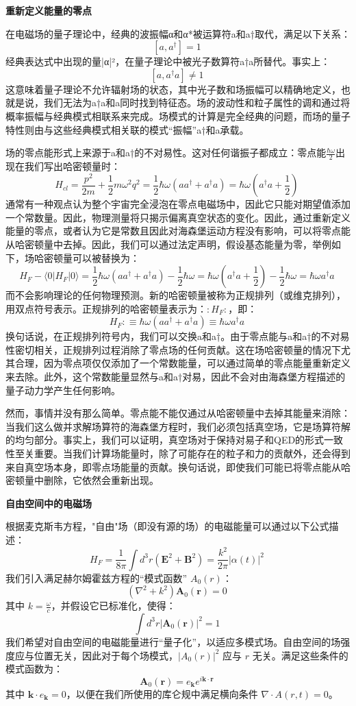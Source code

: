 \textbf{重新定义能量的零点}

在电磁场的量子理论中，经典的波振幅α和α*被运算符a和a†取代，满足以下关系：
\[
[a, a^{\dagger}] = 1~
\]
经典表达式中出现的量|α|²，在量子理论中被光子数算符a†a所替代。事实上：
\[
[a, a^{\dagger}a] \neq 1~
\]
这意味着量子理论不允许辐射场的状态，其中光子数和场振幅可以精确地定义，也就是说，我们无法为a†a和a同时找到特征态。场的波动性和粒子属性的调和通过将概率振幅与经典模式相联系来完成。场模式的计算是完全经典的问题，而场的量子特性则由与这些经典模式相关联的模式“振幅”a†和a承载。

场的零点能形式上来源于a和a†的不对易性。这对任何谐振子都成立：零点能\(\frac{\hbar \omega}{2}\)出现在我们写出哈密顿量时：
\[
H_{cl} = \frac{p^2}{2m} + \frac{1}{2}m\omega^2 q^2 = \frac{1}{2}\hbar \omega (a a^{\dagger} + a^{\dagger} a) = \hbar \omega \left(a^{\dagger} a + \frac{1}{2}\right)~
\]
通常有一种观点认为整个宇宙完全浸泡在零点电磁场中，因此它只能对期望值添加一个常数量。因此，物理测量将只揭示偏离真空状态的变化。因此，通过重新定义能量的零点，或者认为它是常数且因此对海森堡运动方程没有影响，可以将零点能从哈密顿量中去掉。因此，我们可以通过法定声明，假设基态能量为零，举例如下，场哈密顿量可以被替换为：
\[
H_F - \langle 0 | H_F | 0 \rangle = \frac{1}{2} \hbar \omega (a a^{\dagger} + a^{\dagger} a) - \frac{1}{2} \hbar \omega = \hbar \omega (a^{\dagger} a + \frac{1}{2}) - \frac{1}{2} \hbar \omega = \hbar \omega a^{\dagger} a~
\]
而不会影响理论的任何物理预测。新的哈密顿量被称为正规排列（或维克排列），用双点符号表示。正规排列的哈密顿量表示为：\( :H_F: \)，即：
\[
H_F: \equiv \hbar \omega (a a^{\dagger} + a^{\dagger} a) \equiv \hbar \omega a^{\dagger} a~
\]
换句话说，在正规排列符号内，我们可以交换a和a†。由于零点能与a和a†的不对易性密切相关，正规排列过程消除了零点场的任何贡献。这在场哈密顿量的情况下尤其合理，因为零点项仅仅添加了一个常数能量，可以通过简单的零点能量重新定义来去除。此外，这个常数能量显然与a和a†对易，因此不会对由海森堡方程描述的量子动力学产生任何影响。

然而，事情并没有那么简单。零点能不能仅通过从哈密顿量中去掉其能量来消除：当我们这么做并求解场算符的海森堡方程时，我们必须包括真空场，它是场算符解的均匀部分。事实上，我们可以证明，真空场对于保持对易子和QED的形式一致性至关重要。当我们计算场能量时，除了可能存在的粒子和力的贡献外，还会得到来自真空场本身，即零点场能量的贡献。换句话说，即使我们可能已将零点能从哈密顿量中删除，它依然会重新出现。

\textbf{自由空间中的电磁场}

根据麦克斯韦方程，"自由"场（即没有源的场）的电磁能量可以通过以下公式描述：
\[
H_F = \frac{1}{8\pi} \int d^3r \left( \mathbf{E}^2 + \mathbf{B}^2 \right) = \frac{k^2}{2\pi} |\alpha(t)|^2~
\]
我们引入满足赫尔姆霍兹方程的“模式函数” \( A_0(r) \)：
\[
(\nabla^2 + k^2) \mathbf{A}_0(\mathbf{r}) = 0~
\]
其中 \( k = \frac{\omega}{c} \)，并假设它已标准化，使得：
\[
\int d^3r \left| \mathbf{A}_0(\mathbf{r}) \right|^2 = 1~
\]
我们希望对自由空间的电磁能量进行“量子化”，以适应多模式场。自由空间的场强度应与位置无关，因此对于每个场模式，\(|A_0(r)|^2\) 应与 \(r\) 无关。满足这些条件的模式函数为：
\[
\mathbf{A}_0(\mathbf{r}) = e_{\mathbf{k}} e^{i \mathbf{k} \cdot \mathbf{r}}~
\]
其中 \( \mathbf{k} \cdot e_{\mathbf{k}} = 0 \)，以便在我们所使用的库仑规中满足横向条件 \( \nabla \cdot A(r,t) = 0 \)。

